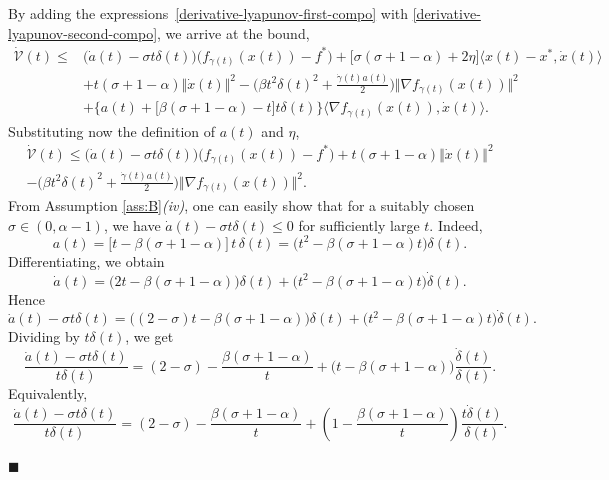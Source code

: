 \documentclass[11pt]{article}
\numberwithin{equation}{section}
\newenvironment{proof}{\bigskip\noindent{\bf Proof.}}{\hfill $\blacksquare$ \par\bigskip\noindent}
\begin{document}
\begin{proof}
\begin{align}
\begin{split}
    \end{split}
\end{align}
By adding the expressions~\eqref{derivative-lyapunov-first-compo} with \eqref{derivative-lyapunov-second-compo}, we arrive at the bound,
\begin{align*}
\dot{\mathcal{V}}(t) \le & \Big(\dot{a}(t)-\sigma t\delta(t)\Big)\Big(f_{\gamma(t)}(x(t))-f^*\Big)+\Big[\sigma(\sigma+1-\alpha)+2\eta\Big]\langle x(t)-x^*,\dot{x}(t) \rangle \\
&+t(\sigma+1-\alpha)\Vert \dot{x}(t) \Vert^2-\Big(\beta t^2\delta(t)^2+\frac{\dot{\gamma}(t)a(t)}{2}\Big)\Vert \nabla f_{\gamma(t)}(x(t)) \Vert^2\\
&+\Big\{a(t)+\Big[\beta(\sigma+1-\alpha)-t\Big]t\delta(t) \Big\}\Big\langle \nabla f_{\gamma(t)}(x(t)),\dot{x}(t) \Big\rangle.
\end{align*}
Substituting now the definition of $a(t)$ and $\eta$, 
\begin{align*}
    \dot{\mathcal{V}}(t) \le  \Big(\dot{a}(t)-\sigma t\delta(t)\Big)\Big(f_{\gamma(t)}(x(t))-f^*\Big) 
+t(\sigma+1-\alpha)\Vert \dot{x}(t) \Vert^2\\
-\Big(\beta t^2\delta(t)^2+\frac{\dot{\gamma}(t)a(t)}{2}\Big)\Vert \nabla f_{\gamma(t)}(x(t)) \Vert^2.
\end{align*}
From Assumption \ref{ass:B}\textit{(iv)}, one can easily show that for a suitably chosen $\sigma \in (0,\alpha-1)$, we have $\dot{a}(t)-\sigma t\delta(t) \le 0$ for sufficiently large $t$. Indeed, 
\[
a(t)=\big[t-\beta(\sigma+1-\alpha)\big]\,t\,\delta(t)
=\big(t^2-\beta(\sigma+1-\alpha)t\big)\delta(t).
\]
Differentiating, we obtain
\[
\dot a(t)
=\big(2t-\beta(\sigma+1-\alpha)\big)\delta(t)
+\big(t^2-\beta(\sigma+1-\alpha)t\big)\dot\delta(t).
\]
Hence
\[
\dot a(t)-\sigma t\delta(t)
=
\Big((2-\sigma)t-\beta(\sigma+1-\alpha)\Big)\delta(t)
+\big(t^2-\beta(\sigma+1-\alpha)t\big)\dot\delta(t).
\]
Dividing by \(t\delta(t)\), we get
\[
\frac{\dot a(t)-\sigma t\delta(t)}{t\delta(t)}
=
(2-\sigma)-\frac{\beta(\sigma+1-\alpha)}{t}
+\Big(t-\beta(\sigma+1-\alpha)\Big)\frac{\dot\delta(t)}{\delta(t)}.
\]
Equivalently,
\[
\frac{\dot a(t)-\sigma t\delta(t)}{t\delta(t)}
=
(2-\sigma)-\frac{\beta(\sigma+1-\alpha)}{t}
+\left(1-\frac{\beta(\sigma+1-\alpha)}{t}\right)\frac{t\dot\delta(t)}{\delta(t)}.
\]


\end{proof}
\end{document}
